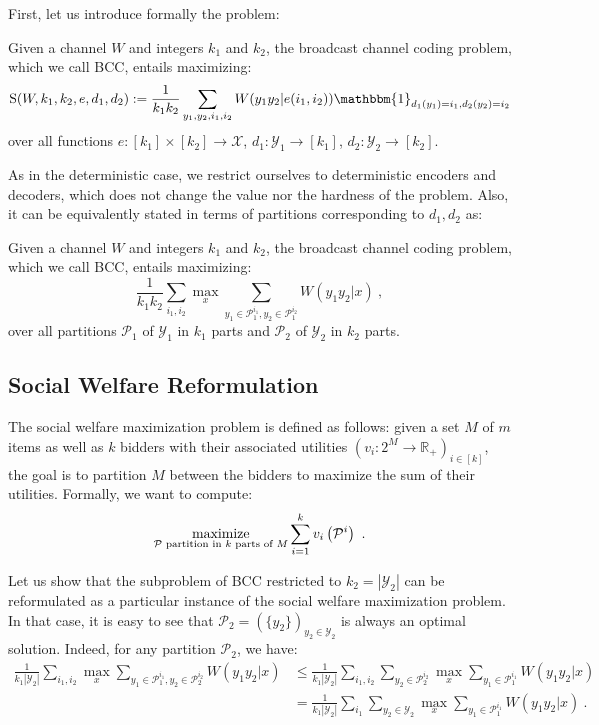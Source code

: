 First, let us introduce formally the problem:
\begin{definition}
  Given a channel $W$ and integers $k_1$ and $k_2$, the broadcast channel coding problem, which we call \textsc{BCC}, entails maximizing:
  \[ \mathrm{S}(W,k_1,k_2,e,d_1,d_2) := \frac{1}{k_1k_2}\sum_{y_1,y_2,i_1,i_2} W(y_1y_2|e(i_1,i_2))\mathbbm{1}_{d_1(y_1)=i_1, d_2(y_2)=i_2}\]
  over all functions $e : [k_1] \times [k_2] \rightarrow \mathcal{X}$, $d_1 : \mathcal{Y}_1 \rightarrow [k_1]$,  $d_2 : \mathcal{Y}_2 \rightarrow [k_2]$.
\end{definition}

As in the deterministic case, we restrict ourselves to deterministic encoders and decoders, which does not change the value nor the hardness of the problem. Also, it can be equivalently stated in terms of partitions corresponding to $d_1,d_2$ as:
\begin{proposition}
  Given a channel $W$ and integers $k_1$ and $k_2$, the broadcast channel coding problem, which we call \textsc{BCC}, entails maximizing:
  \[ \frac{1}{k_1k_2}\sum_{i_1,i_2} \max_x \sum_{y_1 \in \mathcal{P}_1^{i_1}, y_2 \in \mathcal{P}_1^{i_2}} W(y_1y_2|x) \ , \]
  over all partitions $\mathcal{P}_1$ of $\mathcal{Y}_1$ in $k_1$ parts and $\mathcal{P}_2$ of $\mathcal{Y}_2$ in $k_2$ parts.
\end{proposition}


\subsection{Social Welfare Reformulation}
The social welfare maximization problem is defined as follows: given a set $M$ of $m$ items as well as $k$ bidders with their associated utilities $\left(v_i : 2^M \rightarrow \mathbb{R}_+\right)_{i \in [k]}$, the goal is to partition $M$ between the bidders to maximize the sum of their utilities. Formally, we want to compute:
 \[ \underset{\mathcal{P} \text{ partition in $k$ parts of } M}{\operatorname{\text{maximize}}}\sum_{i=1}^k v_i\left(\mathcal{P}^i\right) \ . \]

 Let us show that the subproblem of \textsc{BCC} restricted to $k_2=|\mathcal{Y}_2|$ can be reformulated as a particular instance of the social welfare maximization problem. In that case, it is easy to see that $\mathcal{P}_2 = (\{y_2\})_{y_2 \in \mathcal{Y}_2}$ is always an optimal solution. Indeed, for any partition $\mathcal{P}_2$, we have:
\begin{equation}
  \begin{aligned}
    \frac{1}{k_1|\mathcal{Y}_2|}\sum_{i_1,i_2}  \max_x \sum_{y_1 \in \mathcal{P}_1^{i_1}, y_2 \in \mathcal{P}_2^{i_2}} W(y_1y_2|x) &\leq \frac{1}{k_1|\mathcal{Y}_2|}\sum_{i_1,i_2}  \sum_{y_2 \in \mathcal{P}_2^{i_2}} \max_x \sum_{y_1 \in \mathcal{P}_1^{i_1}} W(y_1y_2|x) \\
    &= \frac{1}{k_1|\mathcal{Y}_2|}\sum_{i_1}  \sum_{y_2 \in \mathcal{Y}_2} \max_x \sum_{y_1 \in \mathcal{P}_1^{i_1}} W(y_1y_2|x) \ .
  \end{aligned}
\end{equation}

